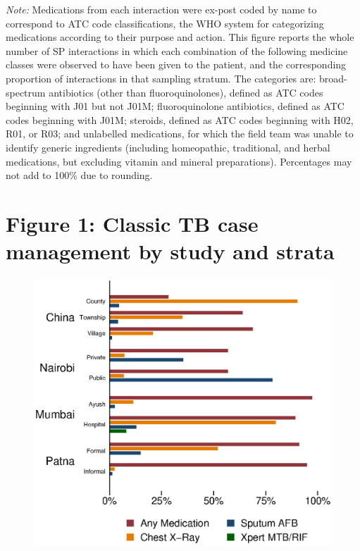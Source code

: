 \documentclass[fleqn,10pt]{wlscirep}
\begin{document}
\noindent\textit{Note:} Medications from each interaction were ex-post coded by name to correspond to ATC code classifications, the WHO system for categorizing medications according to their purpose and action. This figure reports the whole number of SP interactions in which each combination of the following medicine classes were observed to have been given to the patient, and the corresponding proportion of interactions in that sampling stratum. The categories are: broad-spectrum antibiotics (other than fluoroquinolones), defined as ATC codes beginning with J01 but not J01M; fluoroquinolone antibiotics, defined as ATC codes beginning with J01M; steroids, defined as ATC codes beginning with H02, R01, or R03; and unlabelled medications, for which the field team was unable to identify generic ingredients (including homeopathic, traditional, and herbal medications, but excluding vitamin and mineral preparations). Percentages may not add to 100\% due to rounding.

\newpage

\section*{Figure 1: Classic TB case management by study and strata}

\begin{figure}[h]
\includegraphics[width=1\textwidth]{f1.eps}
\end{figure}
\end{document}
